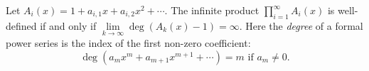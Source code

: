 \begin{lem}
Let $A_i(x) = 1 + a_{i,1} x + a_{i,2} x^2 + \cdots$.
The infinite product $\prod_{i=1}^\infty A_i(x)$ is well-defined if and only if $\lim\limits_{k \to \infty} \deg (A_k(x) - 1) = \infty$.
Here the \emph{degree} of a formal power series is the index of the first non-zero coefficient:
\[
\deg (a_m x^m + a_{m+1} x^{m+1} + \cdots) = m \text{ if } a_m \ne 0.
\]
\end{lem}